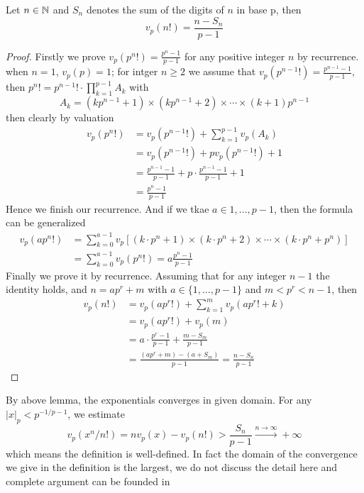 \begin{lemma}
    Let \(n \in \mathbb{N}\) and \(S_n\) denotes the sum of the digits of \(n\) in base p, then 
    \[v_p(n!) =  \frac{n-S_n}{p-1}\]

    \begin{proof}
        Firstly we prove \(v_p(p^n!) = \frac{p^n-1}{p-1}\) for any positive integer \(n\) by recurrence. when \(n=1\), \(v_p(p) = 1\); for intger \(n \geq 2\) we assume that \(v_p(p^{n-1}!) = \frac{p^{n-1}-1}{p-1}\), then \(p^n! = p^{n-1}! \cdot \prod_{k=1}^{p-1} A_k\) with
        \[A_k = (kp^{n-1}+1) \times (kp^{n-1}+2)\times \cdots \times (k+1)p^{n-1}\]
        then clearly by valuation
        \begin{align*}
            v_p(p^n !) &= v_p(p^{n-1}!) + \sum_{k=1}^{p-1}v_p(A_k)\\
            &= v_p(p^{n-1}!) + pv_p(p^{n-1}!)+1 \\
            &= \frac{p^{n-1}-1}{p-1}+p\cdot \frac{p^{n-1}-1}{p-1} +1 \\
            &= \frac{p^{n}-1}{p-1}
        \end{align*}
        Hence we finish our recurrence. And if we tkae \(a \in {1,...,p-1}\), then the formula can be generalized
        \begin{align*}
            v_p(ap^n !) &= \sum_{k=0}^{a-1}v_p[(k\cdot p^n +1)\times(k\cdot p^n +2) \times \cdots \times  (k\cdot p^n + p^n)] \\
            &= \sum_{k=0}^{a-1}v_p(p^n!) = a\frac{p^n-1}{p-1}
        \end{align*}
        Finally we prove it by recurrence. Assuming that for any integer \(n-1\) the identity holds, and \(n= ap^r+m\) with \(a \in \{1,...,p-1\} \) and \(m<p^r<n-1\), then
        \begin{align*}
            v_p(n!) &= v_p(ap^r!)+\sum_{k=1}^{m}v_p(ap^r!+k)\\
            &= v_p(ap^r!)+v_p(m) \\
            &= a\cdot \frac{p^r-1}{p-1}+\frac{m-S_m}{p-1}\\
            &= \frac{(ap^r+m)-(a+S_m)}{p-1} = \frac{n-S_n}{p-1}
        \end{align*}
    \end{proof}
\end{lemma}

By above lemma, the exponentials converges in given domain. For any \(|x|_p < p^{-1/p-1}\), we estimate
\[v_p(x^n/n!) = nv_p(x)-v_p(n!) > \frac{S_n}{p-1} \xrightarrow{n \rightarrow \infty} +\infty\]
which means the definition is well-defined. In fact the domain of the convergence we give in the definition is the largest, we do not discuss the detail here and complete argument can be founded in \cite[Chapter 5]{gouvea1997p}

